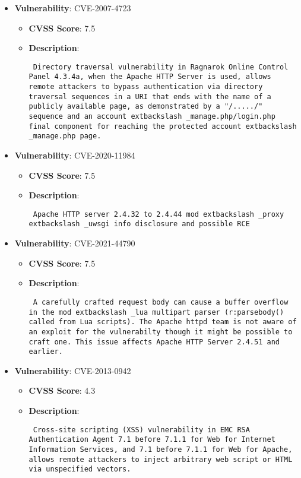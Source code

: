 \documentclass{article}
\begin{document}
\begin{itemize}
        \item \textbf{Vulnerability}: CVE-2007-4723
        \begin{itemize}
            \item \textbf{CVSS Score}:  7.5 
            \item \textbf{Description}: \parbox{\linewidth}{\texttt{ Directory traversal vulnerability in Ragnarok Online Control Panel 4.3.4a, when the Apache HTTP Server is used, allows remote attackers to bypass authentication via directory traversal sequences in a URI that ends with the name of a publicly available page, as demonstrated by a "/...../" sequence and an account	extbackslash _manage.php/login.php final component for reaching the protected account	extbackslash _manage.php page. }}
        \end{itemize}
    
        \item \textbf{Vulnerability}: CVE-2020-11984
        \begin{itemize}
            \item \textbf{CVSS Score}:  7.5 
            \item \textbf{Description}: \parbox{\linewidth}{\texttt{ Apache HTTP server 2.4.32 to 2.4.44 mod	extbackslash _proxy	extbackslash _uwsgi info disclosure and possible RCE }}
        \end{itemize}
    
        \item \textbf{Vulnerability}: CVE-2021-44790
        \begin{itemize}
            \item \textbf{CVSS Score}:  7.5 
            \item \textbf{Description}: \parbox{\linewidth}{\texttt{ A carefully crafted request body can cause a buffer overflow in the mod	extbackslash _lua multipart parser (r:parsebody() called from Lua scripts). The Apache httpd team is not aware of an exploit for the vulnerabilty though it might be possible to craft one. This issue affects Apache HTTP Server 2.4.51 and earlier. }}
        \end{itemize}
    
        \item \textbf{Vulnerability}: CVE-2013-0942
        \begin{itemize}
            \item \textbf{CVSS Score}:  4.3 
            \item \textbf{Description}: \parbox{\linewidth}{\texttt{ Cross-site scripting (XSS) vulnerability in EMC RSA Authentication Agent 7.1 before 7.1.1 for Web for Internet Information Services, and 7.1 before 7.1.1 for Web for Apache, allows remote attackers to inject arbitrary web script or HTML via unspecified vectors. }}
        \end{itemize}
    

\end{itemize}
\end{document}
